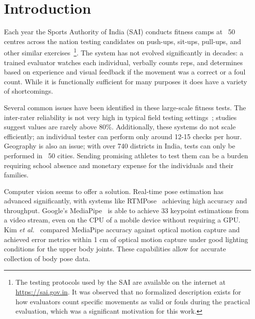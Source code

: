 \documentclass[conference]{IEEEtran}
\begin{document}
\section{Introduction}

Each year the Sports Authority of India (SAI) conducts fitness camps at ~50 centres across the nation testing candidates on push-ups, sit-ups, pull-ups, and other similar exercises~\cite{sai2023}\footnote{The testing protocols used by the SAI are available on the internet at \url{https://sai.gov.in}. It was observed that no formalized description exists for how evaluators count specific movements as valid or fouls during the practical evaluation, which was a significant motivation for this work.}. The system has not evolved significantly in decades: a trained evaluator watches each individual, verbally counts reps, and determines based on experience and visual feedback if the movement was a correct or a foul count. While it is functionally sufficient for many purposes it does have a variety of shortcomings.

Several common issues have been identified in these large-scale fitness tests. The inter-rater reliability is not very high in typical field testing settings~\cite{acft2022}; studies suggest values are rarely above 80\%. Additionally, these systems do not scale efficiently; an individual tester can perform only around 12-15 checks per hour. Geography is also an issue; with over 740 districts in India, tests can only be performed in ~50 cities. Sending promising athletes to test them can be a burden requiring school absence and monetary expense for the individuals and their families.

Computer vision seems to offer a solution. Real-time pose estimation has advanced significantly, with systems like RTMPose~\cite{rtmpose2023} achieving high accuracy and throughput. Google's MediaPipe~\cite{bazarevsky2020,lugaresi2019} is able to achieve 33 keypoint estimations from a video stream, even on the CPU of a mobile device without requiring a GPU. Kim \textit{et al.}~\cite{kim2023} compared MediaPipe accuracy against optical motion capture and achieved error metrics within 1 cm of optical motion capture under good lighting conditions for the upper body joints. These capabilities allow for accurate collection of body pose data.
\end{document}

